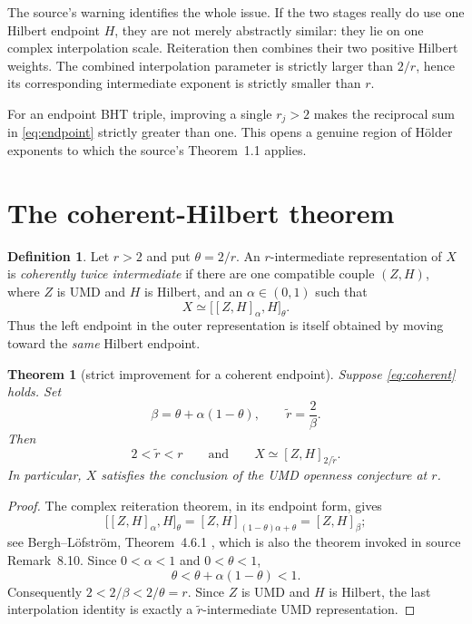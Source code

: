 \documentclass[11pt]{article}
\newtheorem{theorem}{Theorem}
\theoremstyle{definition}
\newtheorem{definition}{Definition}
\begin{document}
The source's warning identifies the whole issue.  If the two stages really do
use one Hilbert endpoint $H$, they are not merely abstractly similar: they lie
on one complex interpolation scale.  Reiteration then combines their two
positive Hilbert weights.  The combined interpolation parameter is strictly
larger than $2/r$, hence its corresponding intermediate exponent is strictly
smaller than $r$.

For an endpoint BHT triple, improving a single $r_j>2$ makes the reciprocal
sum in \eqref{eq:endpoint} strictly greater than one.  This opens a genuine
region of H\"older exponents to which the source's Theorem~1.1 applies.

\section{The coherent-Hilbert theorem}

\begin{definition}
Let $r>2$ and put $\theta=2/r$.  An $r$-intermediate representation of $X$
is \emph{coherently twice intermediate} if there are one compatible couple
$(Z,H)$, where $Z$ is UMD and $H$ is Hilbert, and an $\alpha\in(0,1)$ such
that
\begin{equation}\label{eq:coherent}
  X\simeq \bigl[[Z,H]_{\alpha},H\bigr]_{\theta}.
\end{equation}
Thus the left endpoint in the outer representation is itself obtained by
moving toward the \emph{same} Hilbert endpoint.
\end{definition}

\begin{theorem}[strict improvement for a coherent endpoint]
Suppose \eqref{eq:coherent} holds.  Set
\begin{equation}\label{eq:beta}
  \beta=\theta+\alpha(1-\theta),
  \qquad \widetilde r=\frac{2}{\beta}.
\end{equation}
Then
\[
  2<\widetilde r<r
  \qquad\text{and}\qquad
  X\simeq[Z,H]_{2/\widetilde r}.
\]
In particular, $X$ satisfies the conclusion of the UMD openness conjecture at
$r$.
\end{theorem}

\begin{proof}
The complex reiteration theorem, in its endpoint form, gives
\[
 \bigl[[Z,H]_{\alpha},H\bigr]_{\theta}
   =[Z,H]_{(1-\theta)\alpha+\theta}
   =[Z,H]_{\beta};
\]
see Bergh--L\"ofstr\"om, Theorem~4.6.1 \cite{bergh-lofstrom}, which is also
the theorem invoked in source Remark~8.10.  Since
$0<\alpha<1$ and $0<\theta<1$,
\[
  \theta<\theta+\alpha(1-\theta)<1.
\]
Consequently $2<2/\beta<2/\theta=r$.  Since $Z$ is UMD and $H$ is
Hilbert, the last interpolation identity is exactly a
$\widetilde r$-intermediate UMD representation.
\end{proof}
\end{document}
